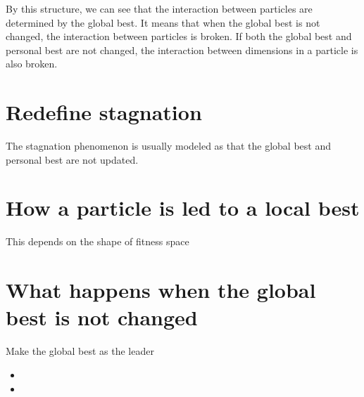 \documentclass[10pt,a4paper]{article}
\begin{document}
By this structure, we can see that the interaction between particles are determined by the global best.
It means that when the global best is not changed, the interaction between particles is broken.
If both the global best and personal best are not changed, the interaction between dimensions in a particle is also broken.

\section{Redefine stagnation}

The stagnation phenomenon is usually modeled as that the global best and personal best are not updated.



\section{How a particle is led to a local best}

This depends on the shape of fitness space

\section{What happens when the global best is not changed}

Make the global best as the leader

\begin{itemize}
\item 
\item 
\end{itemize}
\end{document}
